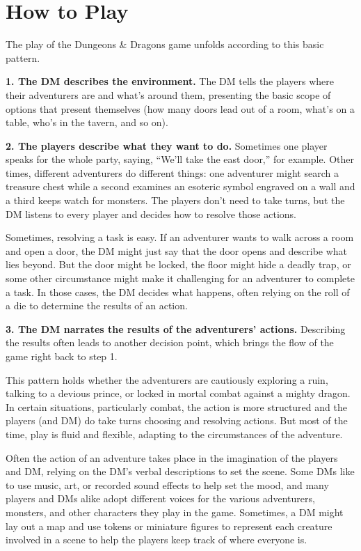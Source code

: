 \section{How to Play}
The play of the Dungeons \& Dragons game unfolds according to this basic pattern.

\textbf{1. The DM describes the environment.} The DM tells the players where their adventurers are and what’s around them, presenting the basic scope of options that present themselves (how many doors lead out of a room, what’s on a table, who’s in the tavern, and so on).

\textbf{2. The players describe what they want to do.} Sometimes one player speaks for the whole party, saying, “We’ll take the east door,” for example. Other times, different adventurers do different things: one adventurer might search a treasure chest while a second examines an esoteric symbol engraved on a wall and a third keeps watch for monsters. The players don’t need to take turns, but the DM listens to every player and decides how to resolve those actions.

Sometimes, resolving a task is easy. If an adventurer wants to walk across a room and open a door, the DM might just say that the door opens and describe what lies beyond. But the door might be locked, the floor might hide a deadly trap, or some other circumstance might make it challenging for an adventurer to complete a task. In those cases, the DM decides what happens, often relying on the roll of a die to determine the results of an action.

\textbf{3. The DM narrates the results of the adventurers’ actions.} Describing the results often leads to another decision point, which brings the flow of the game right back to step 1.

This pattern holds whether the adventurers are cautiously exploring a ruin, talking to a devious prince, or locked in mortal combat against a mighty dragon. In certain situations, particularly combat, the action is more structured and the players (and DM) do take turns choosing and resolving actions. But most of the time, play is fluid and flexible, adapting to the circumstances of the adventure.

Often the action of an adventure takes place in the imagination of the players and DM, relying on the DM’s verbal descriptions to set the scene. Some DMs like to use music, art, or recorded sound effects to help set the mood, and many players and DMs alike adopt different voices for the various adventurers, monsters, and other characters they play in the game. Sometimes, a DM might lay out a map and use tokens or miniature figures to represent each creature involved in a scene to help the players keep track of where everyone is.

